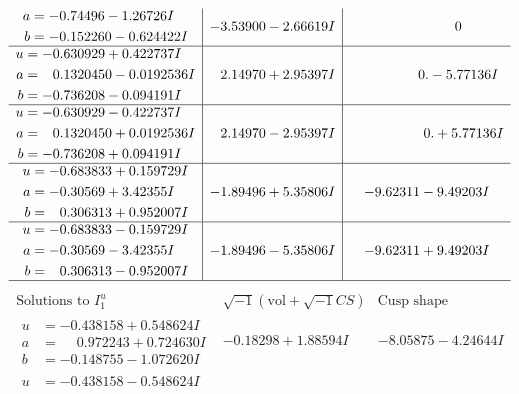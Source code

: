 \documentclass[1p]{elsarticle_modified}
\theoremstyle{definition}
\newcommand{\I}{\sqrt{-1}}
\begin{document}
$$\begin{array}{c|c|c}
\begin{aligned}
a &= -0.74496 - 1.26726 I \\
b &= -0.152260 - 0.624422 I\end{aligned}
 & -3.53900 - 2.66619 I & \phantom{-0.000000 } 0 \\ \hline\begin{aligned}
u &= -0.630929 + 0.422737 I \\
a &= \phantom{-}0.1320450 - 0.0192536 I \\
b &= -0.736208 - 0.094191 I\end{aligned}
 & \phantom{-}2.14970 + 2.95397 I & \phantom{-0.000000 } 0. - 5.77136 I \\ \hline\begin{aligned}
u &= -0.630929 - 0.422737 I \\
a &= \phantom{-}0.1320450 + 0.0192536 I \\
b &= -0.736208 + 0.094191 I\end{aligned}
 & \phantom{-}2.14970 - 2.95397 I & \phantom{-0.000000 -}0. + 5.77136 I \\ \hline\begin{aligned}
u &= -0.683833 + 0.159729 I \\
a &= -0.30569 + 3.42355 I \\
b &= \phantom{-}0.306313 + 0.952007 I\end{aligned}
 & -1.89496 + 5.35806 I & -9.62311 - 9.49203 I \\ \hline\begin{aligned}
u &= -0.683833 - 0.159729 I \\
a &= -0.30569 - 3.42355 I \\
b &= \phantom{-}0.306313 - 0.952007 I\end{aligned}
 & -1.89496 - 5.35806 I & -9.62311 + 9.49203 I\\
 \hline 
 \end{array}$$\newpage$$\begin{array}{c|c|c}  
\text{Solutions to }I^u_{1}& \I (\text{vol} + \sqrt{-1}CS) & \text{Cusp shape}\\
 \hline 
\begin{aligned}
u &= -0.438158 + 0.548624 I \\
a &= \phantom{-}0.972243 + 0.724630 I \\
b &= -0.148755 - 1.072620 I\end{aligned}
 & -0.18298 + 1.88594 I & -8.05875 - 4.24644 I \\ \hline\begin{aligned}
u &= -0.438158 - 0.548624 I \\

\end{aligned}
\end{array}$$
\end{document}
